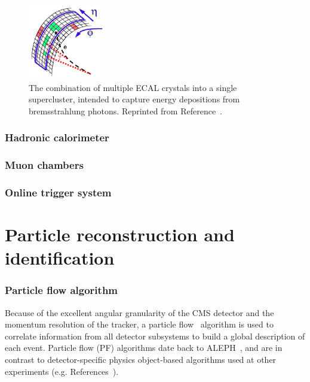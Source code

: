 \begin{figure}
    \begin{center} 
        \includegraphics[width=0.3\textwidth]{figures/cms/sc.png}
        \caption{The combination of multiple ECAL crystals into a single supercluster, intended to capture energy depositions from bremsstrahlung photons.
                  Reprinted from Reference~\cite{cmsecalrev}.}
        \label{fig:cms:sc}
    \end{center}
\end{figure}

\subsubsection{Hadronic calorimeter}

\subsubsection{Muon chambers}

\subsubsection{Online trigger system}

\section{Particle reconstruction and identification}

\subsubsection{Particle flow algorithm}

Because of the excellent angular granularity of the CMS detector and the momentum resolution of the tracker, a particle flow~\cite{cmspf} algorithm is used to correlate information from all detector subsystems to build a global description of each event.
Particle flow (PF) algorithms date back to ALEPH~\needcite, and are in contrast to detector-specific physics object-based algorithms used at other experiments (e.g. References~\needcite).

